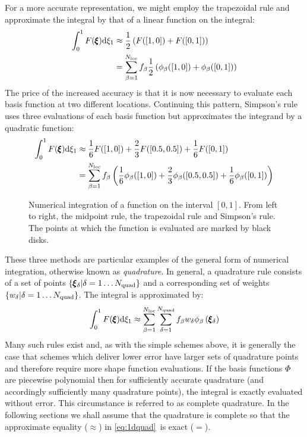 \documentclass[a4paper, 11pt]{book}
\newcommand{\ifhtlatex}[2]{\ifthenelse{\boolean{HTLatex}}{#1}{#2}}
\newcommand{\xfig}[1]{
  \ifhtlatex{
    \texttt{[image: \#1.png]}
  }{
    
  }
}
\begin{document}
For a more accurate representation, we might employ the trapezoidal rule and
approximate the integral by that of a linear function on the integral:
\begin{equation}
  \begin{split}
    \int_{0}^1 F(\pmb{\xi})\mathrm{d}\xi_1&\approx \frac{1}{2}
    \left(F([1,0])+F([0,1])\right)\\ 
    &=\sum_{\beta=1}^{N_\mathrm{loc}} f_{\beta}\frac{1}{2}\left(\phi_{\beta}([1,0])
      +\phi_{\beta}([0,1])\right)
  \end{split}
\end{equation}
The price of the increased accuracy is that it is now necessary to evaluate
each basis function at two different locations. Continuing this pattern,
Simpson's rule uses three evaluations of each basis function but
approximates the integrand by a quadratic function:
\begin{equation}
  \begin{split}
    \int_{0}^1 F(\pmb{\xi})\mathrm{d}\xi_1&\approx 
    \frac{1}{6}F([1,0])
    +\frac{2}{3}F([0.5,0.5])
    +\frac{1}{6}F([0,1])\\ 
    &=\sum_{\beta=1}^{N_\mathrm{loc}} f_{\beta}\left(
      \frac{1}{6}\phi_{\beta}([1,0])
      +\frac{2}{3}\phi_{\beta}([0.5,0.5])
      +\frac{1}{6}\phi_{\beta}([0,1])\right)
  \end{split}
\end{equation}
\begin{figure}[t]
  \centering
  \xfig{numerical_integration}
  \caption{Numerical integration of a function on the interval $[0,1]$. From
  left to right, the midpoint rule, the trapezoidal rule and Simpson's
  rule. The points at which the function is evaluated are marked by black disks.}
\end{figure}
These three methods are particular examples of the general form of numerical
integration, otherwise known as \emph{quadrature}. In general, a quadrature
rule consists of a set of points $\{\pmb{\xi}_\delta|\delta=1\ldots N_\mathrm{quad}\}$ and a corresponding set of
weights $\{w_\delta|\delta=1\ldots N_\mathrm{quad}\}$. The integral is approximated
by:
\begin{equation}\label{eq:1dquad}
    \int_{0}^1 F(\pmb{\xi})\mathrm{d}\xi_1\approx\sum_{\beta=1}^{N_\mathrm{loc}}
    \sum_{\delta=1}^{N_\mathrm{quad}} f_{\beta} w_\delta \phi_{\beta}\left(\pmb{\xi}_\delta\right)
\end{equation}
Many such rules exist and, as with the simple schemes above, it is generally
the case that schemes which deliver lower error have larger sets of
quadrature points and therefore require more shape function evaluations. If
the basis functions $\Phi$ are piecewise polynomial then for sufficiently
accurate quadrature (and accordingly sufficiently many quadrature points),
the integral is exactly evaluated without error. This circumstance is
referred to as complete quadrature. In the following sections we shall
assume that the quadrature is complete so that the approximate equality
($\approx$) in \eqref{eq:1dquad}\ is exact ($=$).
\end{document}
